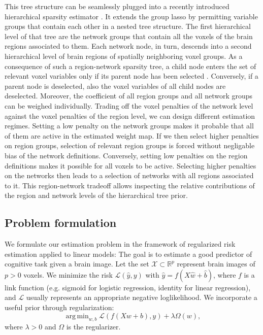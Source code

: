 \documentclass{article}
\DeclareMathOperator*{\argmin}{arg\,min}
\newcommand{\R}{\mathbb{R}}
\begin{document}
This tree structure can be seamlessly plugged into
a recently introduced hierarchical sparsity estimator
\cite{jenatton2011multi}.
It extends the group lasso
\cite{yuan2006model}
by permitting variable groups that contain each other
in a nested tree structure.
The first hierarchical level of that tree are
the network groups that contain all
the voxels of the brain regions associated to them.
Each network node, in turn, descends into a second hierarchical level of
brain regions of spatially neighboring voxel groups.
%
As a consequence of such a region-network sparsity tree,
a child node enters the set of relevant voxel variables only
if its parent node has been selected
\cite{bach2012optimization}.
Conversely,
if a parent node is deselected,
also the voxel variables of all child nodes are deselected.
%
Moreover,
the coefficient of all region groups and all network groups can
be weighed individually.
Trading off the voxel penalties of the network level against the
voxel penalties of the region level,
we can design different estimation regimes.
%
Setting a low penalty on the network groups makes it probable
that all of them are active in the estimated weight map. If we then select
higher penalties on region groups, selection of relevant region groups is
forced without negligable bias of the network definitions.
Conversely, setting low penalties on the region definitions
makes it possible for
all voxels to be active. Selecting higher penalties on the networks then
leads to a selection of networks with all regions associated to it.
%
This region-network tradeoff allows inspecting the relative contributions
of the region and network levels
of the hierarchical tree prior.


\subsection{Problem formulation}
We formulate our estimation problem in the framework of regularized risk
estimation applied to linear models: 
The goal is to estimate a good predictor of cognitive task
given a brain image. Let the set \(\mathcal X\subset\R^p\) represent brain
images of \(p > 0\) voxels.
%
We minimize the risk \(\mathcal L(\hat y, y)\) with
\(\hat y = f(X\hat w + \hat b)\), where \(f\) is a link function 
(e.g. sigmoid for logistic regression, identity for linear regression),
and \(\mathcal L\) usually represents an appropriate negative loglikelihood.
We incorporate a useful prior through regularization:
\[\argmin_{w, b} \mathcal L(f(Xw + b), y) + \lambda\Omega(w),\]
where \(\lambda > 0\) and \(\Omega\) is the regularizer.
\end{document}
